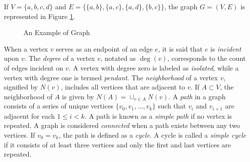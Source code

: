 \begin{example}
\label{ex:binary_tree}
If $V=\{a, b, c, d\}$ and $E=\{ \{a,b\}, \{a,c\}, \{a,d\}, \{b,c\} \}$, the graph $G=(V,E)$ is represented in Figure \ref{fig:Graph-Example}.
\end{example}

\begin{figure}[t]
\centering
{}
\caption{\label{fig:Graph-Example}An Example of Graph}
\end{figure}

When a vertex $v$ serves as an endpoint of an edge $e$, it is said that $e$ is \emph{incident} upon $v$. The \emph{degree} of a vertex $v$, notated as $\deg(v)$, corresponds to the count of edges incident on $v$. A vertex with degree zero is labeled as \emph{isolated}, while a vertex with degree one is termed \emph{pendant}. The \emph{neighborhood} of a vertex $v$, signified by $N(v)$, includes all vertices that are adjacent to $v$. If $A \subset V$, the neighborhood of $A$ is given by $N(A) = \cup_{v \in A} N(v)$. A \emph{path} in a graph consists of a series of unique vertices $\{v_{0}, v_{1}, \ldots ,v_{k}\}$ such that $v_{i}$ and $v_{i+1}$ are adjacent for each $1 \leq i < k$. A path is known as a \emph{simple path} if no vertex is repeated. A graph is considered \emph{connected} when a path exists between any two vertices. If $v_{0} = v_{k}$, the path is defined as a \emph{cycle}. A cycle is called a \emph{simple cycle} if it consists of at least three vertices and only the first and last vertices are repeated. 

